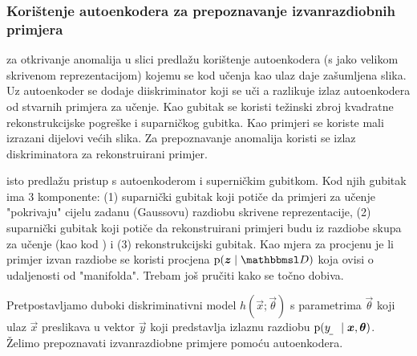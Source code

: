 \documentclass{article}
\begin{document}
\subsubsection{Korištenje autoenkodera za prepoznavanje izvanrazdiobnih primjera}

\citet{Sabokrou:2018:ALOCCND} za otkrivanje anomalija u slici predlažu korištenje autoenkodera (s jako velikom skrivenom reprezentacijom) kojemu se kod učenja kao ulaz daje zašumljena slika. Uz autoenkoder se dodaje diiskriminator koji se uči a razlikuje izlaz autoenkodera od stvarnih primjera za učenje. Kao gubitak se koristi težinski zbroj kvadratne rekonstrukcijske pogreške i suparničkog gubitka. Kao primjeri se koriste mali izrazani dijelovi većih slika. Za prepoznavanje anomalija koristi se izlaz diskriminatora za rekonstruirani primjer.

\citet{Pidhorskyi:2018:GPNDAA} isto predlažu pristup s autoenkoderom i superničkim gubitkom. Kod njih gubitak ima $3$ komponente: (1) suparnički gubitak koji potiče da primjeri za učenje "pokrivaju" cijelu zadanu (Gaussovu) razdiobu skrivene reprezentacije, (2) suparnički gubitak koji potiče da rekonstruirani primjeri budu iz razdiobe skupa za učenje (kao kod \citet{Sabokrou:2018:ALOCCND}) i (3) rekonstrukcijski gubitak. Kao mjera za procjenu je li primjer izvan razdiobe se koristi procjena $\p(\vec z\mid \set D)$ koja ovisi o udaljenosti od "manifolda". Trebam još pručiti kako se točno dobiva.

Pretpostavljamo duboki diskriminativni model $h(\vec x;\vec\theta)$ s parametrima $\vec\theta$ koji ulaz $\vec x$ preslikava u vektor $\vec y$ koji predstavlja izlaznu razdiobu  $\p(\rvar y\mid \vec x, \vec\theta)$. Želimo prepoznavati izvanrazdiobne primjere pomoću autoenkodera.
\end{document}
